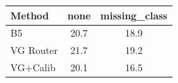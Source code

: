 \begin{tabular}{lcc}
\toprule
Method & none & missing\_class \\
\midrule
B5 & 20.7 & 18.9 \\
VG Router & 21.7 & 19.2 \\
VG+Calib & 20.1 & 16.5 \\
\bottomrule
\end{tabular}
